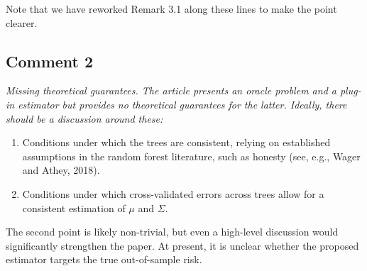 \documentclass[12pt]{article}
\newcommand{\comment}[1]{\begin{refbox}\itshape #1\end{refbox}}
\begin{document}
Note that we have reworked Remark 3.1 along these lines to make the point clearer. 

\subsection*{Comment 2}

\comment{Missing theoretical guarantees. The article presents an oracle
problem and a plug-in estimator but provides no theoretical guarantees for
the latter. Ideally, there should be a discussion around these:
\begin{enumerate}
\item Conditions under which the trees are consistent, relying on
established assumptions in the random forest literature, such as honesty
(see, e.g., Wager and Athey, 2018).
\item Conditions under which cross-validated errors across trees allow for
a consistent estimation of $\mu$ and $\Sigma$.
\end{enumerate}
The second point is likely non-trivial, but even a high-level discussion
would significantly strengthen the paper. At present, it is unclear whether
the proposed estimator targets the true out-of-sample risk.}

\ 
\end{document}
